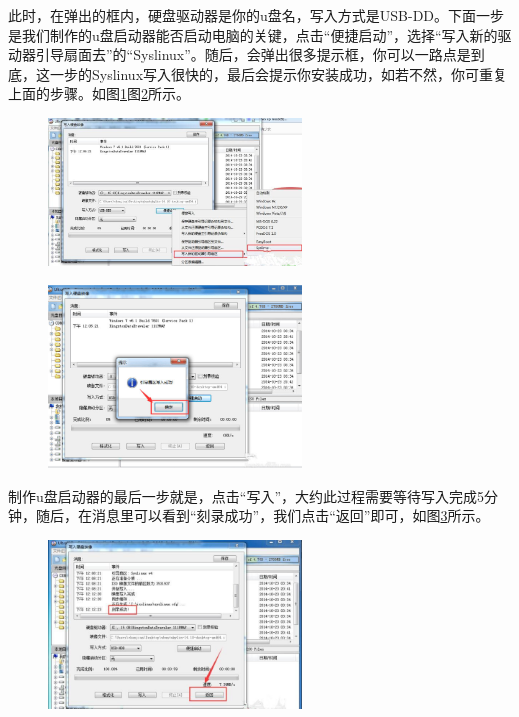 \documentclass[12pt]{article}
\begin{document}
  此时，在弹出的框内，硬盘驱动器是你的u盘名，写入方式是USB-DD。下面一步是我们制作的u盘启动器能否启动电脑的关键，点击“便捷启动”，选择“写入新的驱动器引导扇面去”的“Syslinux”。随后，会弹出很多提示框，你可以一路点是到底，这一步的Syslinux写入很快的，最后会提示你安装成功，如若不然，你可重复上面的步骤。如图\ref{tu2}图\ref{tu3}所示。
\begin{figure}[!htb] %
\centering
\includegraphics[width=0.6\textwidth]{tu2.jpeg}
\caption{}
\label{tu2}
\end{figure}  

\begin{figure}[!htb] %
\centering
\includegraphics[width=0.6\textwidth]{tu3.jpeg}
\caption{}
\label{tu3}
\end{figure}  
  制作u盘启动器的最后一步就是，点击“写入”，大约此过程需要等待写入完成5分钟，随后，在消息里可以看到“刻录成功”，我们点击“返回”即可，如图\ref{tu5}所示。

\begin{figure}[!htb] %
\centering
\includegraphics[width=0.6\textwidth]{tu5.jpeg}
\caption{}
\label{tu5}
\end{figure} 
 
\end{document}
